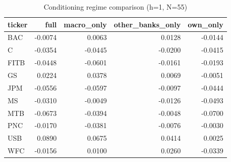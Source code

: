 \documentclass{article}
\begin{document}
\begin{table}[ht]
\centering
\caption{Conditioning regime comparison (h=1, N=55)}
\label{tab:regime}
\begin{tabular}{lrrrr}
\toprule
ticker & full & macro_only & other_banks_only & own_only \\
\midrule
BAC & -0.0074 & 0.0063 & 0.0128 & -0.0144 \\
C & -0.0354 & -0.0445 & -0.0200 & -0.0415 \\
FITB & -0.0448 & -0.0601 & -0.0161 & -0.0193 \\
GS & 0.0224 & 0.0378 & 0.0069 & -0.0051 \\
JPM & -0.0556 & -0.0597 & -0.0097 & -0.0444 \\
MS & -0.0310 & -0.0049 & -0.0126 & -0.0493 \\
MTB & -0.0673 & -0.0394 & -0.0048 & -0.0700 \\
PNC & -0.0170 & -0.0381 & -0.0076 & -0.0030 \\
USB & 0.0890 & 0.0675 & 0.0414 & 0.0025 \\
WFC & -0.0156 & 0.0100 & 0.0260 & -0.0339 \\
\bottomrule
\end{tabular}
\end{table}
\end{document}
